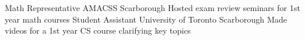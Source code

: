 \begin{cvhonors}
  \cvhonor
    {Math Representative}
    {AMACSS}
    {Scarborough}
    {}
    {Hosted exam review seminars for 1st year math courses}
  \cvhonor
    {Student Assistant}
    {University of Toronto}
    {Scarborough}
    {}
    {Made videos for a 1st year CS course clarifying key topics}
\end{cvhonors}